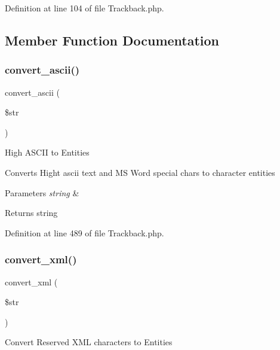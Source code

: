 Definition at line 104 of file Trackback.\+php.



\subsection{Member Function Documentation}
\mbox{\label{class_c_i___trackback_a0029bda7d34a222a5bda4ac894c31ac1}} 
\subsubsection{\texorpdfstring{convert\_ascii()}{convert\_ascii()}}
{\footnotesize\ttfamily convert\+\_\+ascii (\begin{DoxyParamCaption}\item[{}]{\$str }\end{DoxyParamCaption})}

High A\+S\+C\+II to Entities

Converts Hight ascii text and MS Word special chars to character entities


\begin{DoxyParams}{Parameters}
{\em string} & \\
\hline
\end{DoxyParams}
\begin{DoxyReturn}{Returns}
string 
\end{DoxyReturn}


Definition at line 489 of file Trackback.\+php.

\mbox{\label{class_c_i___trackback_a1ec67af2037561b65ffe49b59727cb53}} 
\subsubsection{\texorpdfstring{convert\_xml()}{convert\_xml()}}
{\footnotesize\ttfamily convert\+\_\+xml (\begin{DoxyParamCaption}\item[{}]{\$str }\end{DoxyParamCaption})}

Convert Reserved X\+ML characters to Entities


